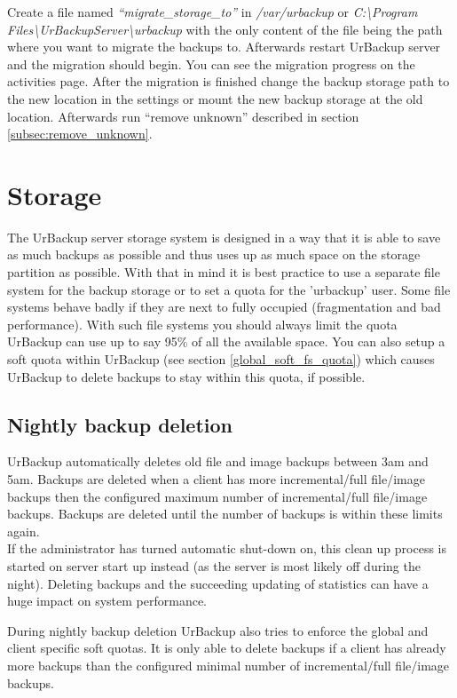 \documentclass[a4paper,10pt]{article}
\begin{document}
\noindent Create a file named \textsl{``migrate\_storage\_to''} in \textsl{/var/urbackup} or \textsl{C:\textbackslash\allowbreak Program Files\textbackslash\allowbreak UrBackupServer\textbackslash\allowbreak urbackup} with the only content of the file being the path where you want to migrate the backups to. Afterwards restart UrBackup server and the migration should begin. You can see the migration progress on the activities page. After the migration is finished change the backup storage path to the new location in the settings or mount the new backup storage at the old location. Afterwards run ``remove unknown'' described in section \ref{subsec:remove_unknown}.

\section{Storage}

The UrBackup server storage system is designed in a way that it is able to save
as much backups as possible and thus uses up as much space on the storage
partition as possible. With that in mind it is best practice to use a separate
file system for the backup storage or to set a quota for the 'urbackup' user.
Some file systems behave badly if they are next to fully occupied (fragmentation
and bad performance). With such file systems you should always limit the quota
UrBackup can use up to say 95\% of all the available space. You can also setup
a soft quota within UrBackup (see section \ref{global_soft_fs_quota}) which
causes UrBackup to delete backups to stay within this quota, if possible.

\subsection{Nightly backup deletion}

UrBackup automatically deletes old file and image backups between 3am and 5am. Backups are deleted when a client has more incremental/full file/image backups then the configured maximum number of incremental/full file/image backups. Backups are deleted until the number of backups is within these limits again.\\
If the administrator has turned automatic shut-down on, this clean up process is started on server start up instead (as the server is most likely off during the night). Deleting backups and the succeeding updating of statistics can have a huge impact on system performance.

During nightly backup deletion UrBackup also tries to enforce the global and client specific soft quotas. It is only able to delete backups if a client has already more backups than the configured minimal number of incremental/full file/image backups.
\end{document}
